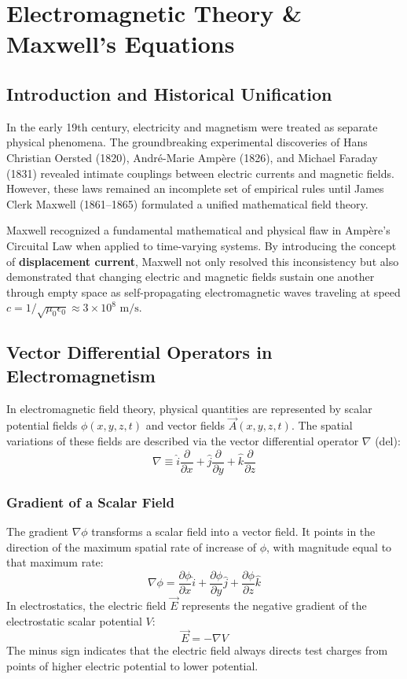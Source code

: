 \chapter{Electromagnetic Theory \& Maxwell's Equations}

\section{Introduction and Historical Unification}
In the early 19th century, electricity and magnetism were treated as separate physical phenomena. The groundbreaking experimental discoveries of Hans Christian Oersted (1820), André-Marie Ampère (1826), and Michael Faraday (1831) revealed intimate couplings between electric currents and magnetic fields. However, these laws remained an incomplete set of empirical rules until James Clerk Maxwell (1861--1865) formulated a unified mathematical field theory. 

Maxwell recognized a fundamental mathematical and physical flaw in Ampère's Circuital Law when applied to time-varying systems. By introducing the concept of \textbf{displacement current}, Maxwell not only resolved this inconsistency but also demonstrated that changing electric and magnetic fields sustain one another through empty space as self-propagating electromagnetic waves traveling at speed $c = 1/\sqrt{\mu_0 \epsilon_0} \approx 3 \times 10^8\text{ m/s}$.

\section{Vector Differential Operators in Electromagnetism}
In electromagnetic field theory, physical quantities are represented by scalar potential fields $\phi(x,y,z,t)$ and vector fields $\vec{A}(x,y,z,t)$. The spatial variations of these fields are described via the vector differential operator $\nabla$ (del):
\begin{equation}
\nabla \equiv \hat{i}\frac{\partial}{\partial x} + \hat{j}\frac{\partial}{\partial y} + \hat{k}\frac{\partial}{\partial z}
\end{equation}

\subsection{Gradient of a Scalar Field}
The gradient $\nabla \phi$ transforms a scalar field into a vector field. It points in the direction of the maximum spatial rate of increase of $\phi$, with magnitude equal to that maximum rate:
\begin{equation}
\nabla \phi = \frac{\partial \phi}{\partial x}\hat{i} + \frac{\partial \phi}{\partial y}\hat{j} + \frac{\partial \phi}{\partial z}\hat{k}
\end{equation}
In electrostatics, the electric field $\vec{E}$ represents the negative gradient of the electrostatic scalar potential $V$:
\begin{equation}
\vec{E} = -\nabla V
\end{equation}
The minus sign indicates that the electric field always directs test charges from points of higher electric potential to lower potential.

